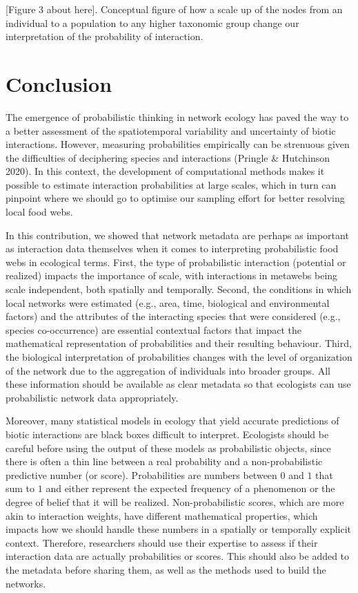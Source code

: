 \documentclass[10pt,oneside]{article}
\begin{document}
{[}Figure 3 about here{]}. Conceptual figure of how a scale up of the
nodes from an individual to a population to any higher taxonomic group
change our interpretation of the probability of interaction.

\hypertarget{conclusion}{%
\section{Conclusion}\label{conclusion}}

The emergence of probabilistic thinking in network ecology has paved the
way to a better assessment of the spatiotemporal variability and
uncertainty of biotic interactions. However, measuring probabilities
empirically can be strenuous given the difficulties of deciphering
species and interactions (Pringle \& Hutchinson 2020). In this context,
the development of computational methods makes it possible to estimate
interaction probabilities at large scales, which in turn can pinpoint
where we should go to optimise our sampling effort for better resolving
local food webs.

In this contribution, we showed that network metadata are perhaps as
important as interaction data themselves when it comes to interpreting
probabilistic food webs in ecological terms. First, the type of
probabilistic interaction (potential or realized) impacts the importance
of scale, with interactions in metawebs being scale independent, both
spatially and temporally. Second, the conditions in which local networks
were estimated (e.g., area, time, biological and environmental factors)
and the attributes of the interacting species that were considered
(e.g., species co-occurrence) are essential contextual factors that
impact the mathematical representation of probabilities and their
resulting behaviour. Third, the biological interpretation of
probabilities changes with the level of organization of the network due
to the aggregation of individuals into broader groups. All these
information should be available as clear metadata so that ecologists can
use probabilistic network data appropriately.

Moreover, many statistical models in ecology that yield accurate
predictions of biotic interactions are black boxes difficult to
interpret. Ecologists should be careful before using the output of these
models as probabilistic objects, since there is often a thin line
between a real probability and a non-probabilistic predictive number (or
score). Probabilities are numbers between \(0\) and \(1\) that sum to
\(1\) and either represent the expected frequency of a phenomenon or the
degree of belief that it will be realized. Non-probabilistic scores,
which are more akin to interaction weights, have different mathematical
properties, which impacts how we should handle these numbers in a
spatially or temporally explicit context. Therefore, researchers should
use their expertise to assess if their interaction data are actually
probabilities or scores. This should also be added to the metadata
before sharing them, as well as the methods used to build the networks.
\end{document}
